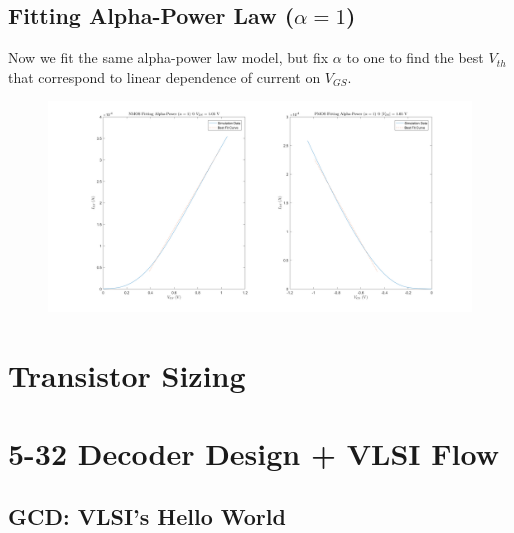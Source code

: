 \documentclass[11pt]{article}
\begin{document}
\subsection{Fitting Alpha-Power Law ($\alpha = 1$)}
Now we fit the same alpha-power law model, but fix $\alpha$ to one to find the best $V_{th}$ that correspond to linear dependence of current on $V_{GS}$.

\begin{figure}[H]
	\centerline{\includegraphics[width=\textwidth]{images/alpha_power_fit_alpha1.png}}
\end{figure}

\section{Transistor Sizing}

\section{5-32 Decoder Design + VLSI Flow}

\subsection{GCD: VLSI's Hello World}
\end{document}
